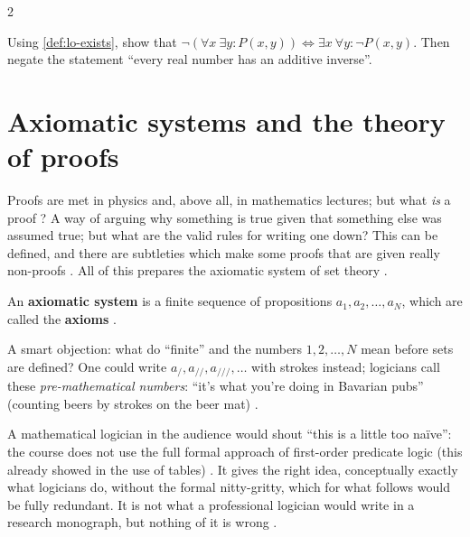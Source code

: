 \begin{paracol}{2}
\begin{exercise}\label{ex:lo-negq}
Using \cref{def:lo-exists}, show that $\neg(\forall x\ \exists y\colon P(x,y))\Leftrightarrow\exists x\ \forall y\colon
\neg P(x,y)$. Then negate the statement ``every real number has an additive inverse''.
\end{exercise}

\section{Axiomatic systems and the theory of proofs}\label{sec:lo-proofs}

Proofs are met in physics and, above all, in mathematics lectures; but what \emph{is} a proof
? A way of arguing why something is true given that something else was assumed true; but what are
the valid rules for writing one down? This can be defined, and there are subtleties which make some proofs
that are given really non-proofs . All of this prepares the axiomatic system of set theory
.

\begin{definition}\label{def:lo-axsys}
An \textbf{axiomatic system} is a finite sequence of propositions $a_1,a_2,\dots,a_N$, which are called the
\textbf{axioms} .
\end{definition}

\begin{aside}
A smart objection: what do ``finite'' and the numbers $1,2,\dots,N$ mean before sets are defined? One could
write $a_{/},a_{//},a_{///},\dots$ with strokes instead; logicians call these \emph{pre-mathematical numbers}:
``it's what you're doing in Bavarian pubs'' (counting beers by strokes on the beer mat) .
\end{aside}

\begin{coursenote}[Disclaimer]
A mathematical logician in the audience would shout ``this is a little too na\"ive'': the course does not use the
full formal approach of first-order predicate logic (this already showed in the use of tables) .
It gives the right idea, conceptually exactly what logicians do, without the formal nitty-gritty, which for
what follows would be fully redundant. It is not what a professional logician would write in a research
monograph, but nothing of it is wrong .
\end{coursenote}


\end{paracol}
